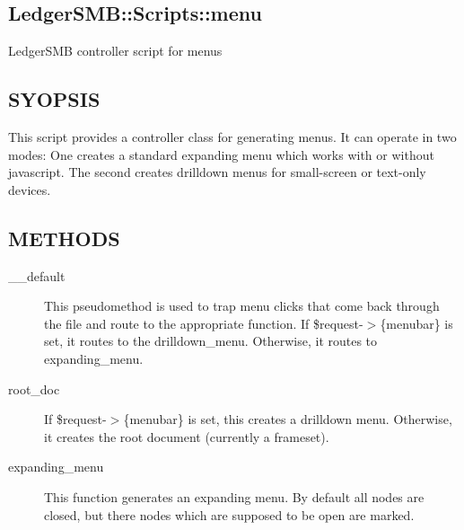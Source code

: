 \begin{description}
\section{LedgerSMB::Scripts::menu\label{LedgerSMB::Scripts::menu}}


LedgerSMB controller script for menus

\subsection*{SYOPSIS\label{LedgerSMB::Scripts::menu_SYOPSIS}}


This script provides a controller class for generating menus.  It can operate in
two modes:  One creates a standard expanding menu which works with or without
javascript.  The second creates drilldown menus for small-screen or text-only
devices.

\subsection*{METHODS\label{LedgerSMB::Scripts::menu_METHODS}}
\begin{description}

\item[{\_\_default}] \mbox{}

This pseudomethod is used to trap menu clicks that come back through the file
and route to the appropriate function.  If \$request-$>$\{menubar\} is set, it routes
to the drilldown\_menu.  Otherwise, it routes to expanding\_menu.

\end{description}
\begin{description}

\item[{root\_doc}] \mbox{}

If \$request-$>$\{menubar\} is set, this creates a drilldown menu.  Otherwise, it
creates the root document (currently a frameset).

\end{description}
\begin{description}

\item[{expanding\_menu}] \mbox{}

This function generates an expanding menu.  By default all nodes are closed, but
there nodes which are supposed to be open are marked.


\end{description}
\end{description}

